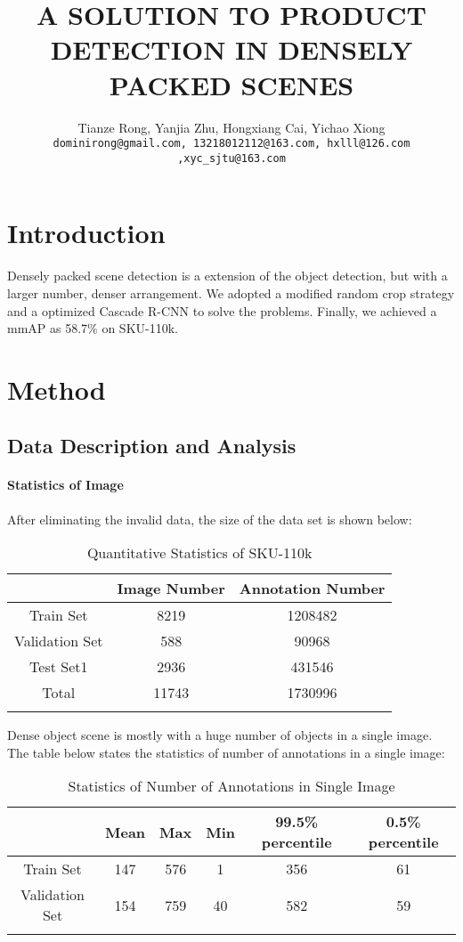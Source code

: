 \documentclass{article}
\title{A SOLUTION TO PRODUCT DETECTION IN DENSELY PACKED SCENES}
\author{
 Tianze Rong, Yanjia Zhu, Hongxiang Cai, Yichao Xiong \\
  \texttt{dominirong@gmail.com, 13218012112@163.com, hxlll@126.com ,xyc\_sjtu@163.com}
}
\begin{document}
\maketitle

\section{Introduction}
Densely packed scene detection is a extension of the object detection, but with a larger number, denser arrangement. We adopted a modified random crop strategy and a optimized Cascade R-CNN to solve the problems. Finally, we achieved a mmAP as 58.7\% on SKU-110k\cite{sku}. 
\section{Method}
\subsection{Data Description and Analysis}
\paragraph{Statistics of Image} After eliminating the invalid data, the size of the data set is shown below:
\begin{table}[htb]
    \centering
    \begin{tabular}{ccc}
    \hline
        &Image Number & Annotation Number \\
    \hline
         Train Set& 8219& 1208482\\
         Validation Set & 588 & 90968\\
         Test Set1& 2936 & 431546\\
    \hline
        Total & 11743 & 1730996\\
    \hline
    \\
    \end{tabular}
    \caption{Quantitative Statistics of SKU-110k}
    \label{tab:my_label}
\end{table}
\par Dense object scene is mostly with a huge number of objects in a single image. The table below states the statistics of number of annotations in a single image:
\begin{table}[htb]
    \centering
    \begin{tabular}{cccccc}
    \hline
        &Mean & Max & Min & 99.5\% percentile & 0.5\% percentile\\
    \hline
         Train Set& 147& 576&1&356&61\\
         Validation Set & 154 & 759&40&582&59\\

    \hline
    \\
    \end{tabular}
    \caption{Statistics of Number of Annotations in Single Image}
    \label{tab:my_label}
\end{table}
\end{document}
